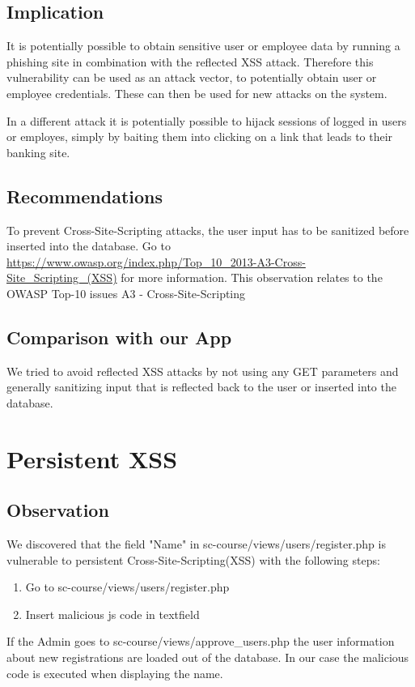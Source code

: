 \subsection{Implication}
It is potentially possible to obtain sensitive user or employee data by running a phishing site in combination with the reflected XSS attack. Therefore this vulnerability can be used as an attack vector, to potentially obtain user or employee credentials. These can then be used for new attacks on the system.

In a different attack it is potentially possible to hijack sessions of logged in users or employes, simply by baiting them into clicking on a link that leads to their banking site. 

\subsection{Recommendations}
To prevent Cross-Site-Scripting attacks, the user input has to be sanitized before inserted into the database. Go to \url{https://www.owasp.org/index.php/Top_10_2013-A3-Cross-Site_Scripting_(XSS)} for more information. \newline
This observation relates to the OWASP Top-10 issues A3 - Cross-Site-Scripting

\subsection{Comparison with our App}
We tried to avoid reflected XSS attacks by not using any GET parameters and generally sanitizing input that is reflected back to the user or inserted into the database.

\section{Persistent XSS}

\subsection{Observation}

We discovered that the field "Name" in sc-course/views/users/register.php is vulnerable to persistent Cross-Site-Scripting(XSS) with the following steps:
\begin{enumerate}
 \item Go to sc-course/views/users/register.php
 \item Insert malicious js code in textfield
\end{enumerate}
 If the Admin goes to sc-course/views/approve\_users.php the user information about new registrations are  loaded out of the database. In our case the malicious code is executed when displaying the name.

